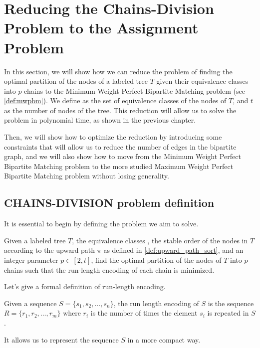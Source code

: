 \section{Reducing the Chains-Division Problem to the Assignment Problem}
In this section, we will show how we can reduce the problem of finding the optimal partition of the nodes of a labeled tree $T$ given their equivalence classes into $p$ chains to the Minimum Weight Perfect Bipartite Matching problem (see \cref{def:mwpbm}). We define \equivsetmath as the set of equivalence classes of the nodes of $T$, and $t$ as the number of nodes of the tree. This reduction will allow us to solve the problem in polynomial time, as shown in the previous chapter.

Then, we will show how to optimize the reduction by introducing some constraints that will allow us to reduce the number of edges in the bipartite graph, and we will also show how to move from the Minimum Weight Perfect Bipartite Matching problem to the more studied Maximum Weight Perfect Bipartite Matching problem without losing generality.

\subsection{\textsc{CHAINS-DIVISION} problem definition}
It is essential to begin by defining the problem we aim to solve.

\begin{definition} \label{def:problem_def}
    Given a labeled tree $T$, the equivalence classes \equivsetmath, the stable order of the nodes in $T$ according to the upward path $\pi$ as defined in \cref{def:upward_path_sort}, and an integer parameter $p \in [2, t]$, find the optimal partition of the nodes of $T$ into $p$ chains such that the run-length encoding of each chain is minimized.
\end{definition}

Let's give a formal definition of run-length encoding.
\begin{definition}
    Given a sequence $S = \{s_1, s_2, \dots, s_n\}$, the run length encoding of $S$ is the sequence $R = \{r_1, r_2, \dots, r_m\}$ where $r_i$ is the number of times the element $s_i$ is repeated in $S$.
\end{definition}

It allows us to represent the sequence $S$ in a more compact way. 


